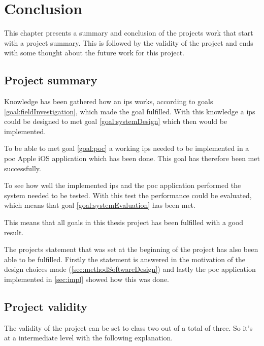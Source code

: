 \chapter{Conclusion}\label{conclusion}
This chapter presents a summary and conclusion of the projects work that start with a project summary.
This is followed by the validity of the project and ends with some thought about the future work for this project.


\section{Project summary}\label{sec:conclusionProjectSummary}
Knowledge has been gathered how an \acrfull{ips} works, according to goals \ref{goal:fieldInvestigation}, which made the goal fulfilled.
With this knowledge a \acrshort{ips} could be designed to met goal \ref{goal:systemDesign} which then would be implemented.

\bigskip

To be able to met goal \ref{goal:poc} a working \acrshort{ips} needed to be implemented in a \acrshort{poc} Apple iOS application which has been done.
This goal has therefore been met successfully.

\bigskip

To see how well the implemented \acrshort{ips} and the \acrshort{poc} application performed the system needed to be tested.
With this test the performance could be evaluated, which means that goal \ref{goal:systemEvaluation} has been met.

\bigskip

This means that all goals in this thesis project has been fulfilled with a good result.

\bigskip

The projects statement that was set at the beginning of the project has also been able to be fulfilled.
Firstly the statement is answered in the motivation of the design choices made (\cref{sec:methodSoftwareDesign}) and lastly the \acrshort{poc} application implemented in \cref{sec:impl} showed how this was done.


\section{Project validity}\label{sec:conclusionProjectValidity}
The validity of the project can be set to class two out of a total of three.
So it's at a intermediate level with the following explanation.

\bigskip

